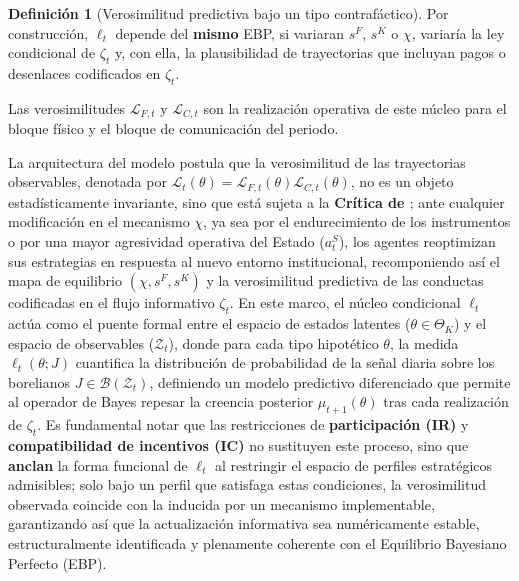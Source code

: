 \documentclass[12pt]{article}
\providecommand{\textcite}{\citet}
\newenvironment{fnnote}{%
  \begin{minipage}[t]{\linewidth}%
  \sloppy
}{\end{minipage}}
\theoremstyle{definition}
\newtheorem{definition}[theorem]{Definición}
\theoremstyle{remark}
\newcommand{\1}{\mathbf{1}}
\begin{document}
\begin{definition}[Verosimilitud predictiva bajo un tipo contrafáctico]
{\begin{fnnote}
\par\smallskip
Por construcción, $\ell_t$ depende del \textbf{mismo} EBP, si variaran $s^F$, $s^K$ o $\chi$, variaría la ley condicional de $\zeta_t$ y, con ella, la plausibilidad de trayectorias que incluyan pagos o desenlaces codificados en $\zeta_t$.
\end{fnnote}}
Las verosimilitudes $\mathcal{L}_{F,t}$ y $\mathcal{L}_{C,t}$ son la realización operativa de este núcleo para el bloque físico y el bloque de comunicación del periodo.
\end{definition}


La arquitectura del modelo postula que la verosimilitud de las trayectorias observables, denotada por $\mathcal{L}_t(\theta)=\mathcal{L}_{F,t}(\theta)\mathcal{L}_{C,t}(\theta)$, no es un objeto estadísticamente invariante, sino que está sujeta a la \textbf{Crítica de \textcite{Lucas1976}}; ante cualquier modificación en el mecanismo $\chi$, ya sea por el endurecimiento de los instrumentos o por una mayor agresividad operativa del Estado ($a_t^S$), los agentes reoptimizan sus estrategias en respuesta al nuevo entorno institucional, recomponiendo así el mapa de equilibrio $(\chi, s^F, s^K)$ y la verosimilitud predictiva de las conductas codificadas en el flujo informativo $\zeta_t$. En este marco, el núcleo condicional $\ell_t$ actúa como el puente formal entre el espacio de estados latentes ($\theta \in \Theta_K$) y el espacio de observables ($\mathcal{Z}_t$), donde para cada tipo hipotético $\theta$, la medida $\ell_t(\theta; J)$ cuantifica la distribución de probabilidad de la señal diaria sobre los borelianos $J \in \mathcal{B}(\mathcal{Z}_t)$, definiendo un modelo predictivo diferenciado que permite al operador de Bayes repesar la creencia posterior $\mu_{t+1}(\theta)$ tras cada realización de $\zeta_t$. Es fundamental notar que las restricciones de \textbf{participación (IR)} y \textbf{compatibilidad de incentivos (IC)} \textcite{Myerson1979IC, BoltonDewatripont2005} no sustituyen este proceso, sino que \textbf{anclan} la forma funcional de $\ell_t$ al restringir el espacio de perfiles estratégicos admisibles; solo bajo un perfil que satisfaga estas condiciones, la verosimilitud observada coincide con la inducida por un mecanismo implementable, garantizando así que la actualización informativa sea numéricamente estable, estructuralmente identificada y plenamente coherente con el Equilibrio Bayesiano Perfecto (EBP).



\end{document}
